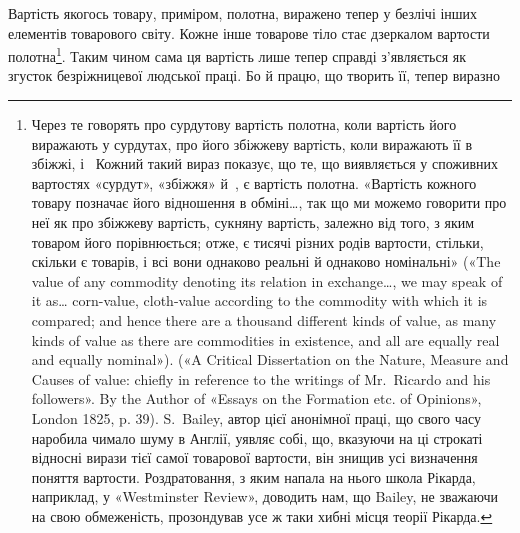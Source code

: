 Вартість якогось товару, приміром, полотна, виражено тепер
у безлічі інших елементів товарового світу. Кожне інше товарове
тіло стає дзеркалом вартости полотна\footnote{
Через те говорять про сурдутову вартість полотна, коли вартість
його виражають у сурдутах, про його збіжжеву вартість, коли виражають
її в збіжжі, і~ Кожний такий вираз показує, що те, що виявляється
у споживних вартостях «сурдут», «збіжжя» й~, є вартість полотна.
«Вартість кожного товару позначає його відношення в обміні\dots{},
так що ми можемо говорити про неї як про збіжжеву вартість, сукняну
вартість, залежно від того, з яким товаром його порівнюється; отже, є
тисячі різних родів вартости, стільки, скільки є товарів, і всі вони однаково
реальні й однаково номінальні» («The value of any commodity denoting
its relation in exchange\dots{}, we may speak of it as\dots{} corn-value,
cloth-value according to the commodity with which it is compared; and
hence there are a thousand different kinds of value, as many kinds
of value as there are commodities in existence, and all are equally real
and equally nominal»). («A Critical Dissertation on the Nature, Measure
and Causes of value: chiefly in reference to the writings of Mr.~Ricardo
and his followers». By the Author of «Essays on the Formation etc. of Opinions»,
London 1825, p. 39). S.~Bailey, автор цієї анонімної праці, що
свого часу наробила чимало шуму в Англії, уявляє собі, що, вказуючи
на ці строкаті відносні вирази тієї самої товарової вартости, він знищив
усі визначення поняття вартости. Роздратовання, з яким напала на нього
школа Рікарда, наприклад, у «Westminster Review», доводить нам, що
Bailey, не зважаючи на свою обмеженість, прозондував усе ж таки
хибні місця теорії Рікарда.
}. Таким чином сама ця
вартість лише тепер справді з’являється як згусток безріжницевої
людської праці. Бо й працю, що творить її, тепер виразно
\parbreak{}  %
